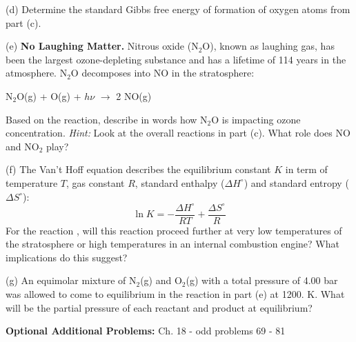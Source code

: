 \documentclass[11pt]{article}
\begin{document}
(d) Determine the standard Gibbs free energy of formation of oxygen atoms from part (c).

(e) \textbf{No Laughing Matter.} Nitrous oxide (N$_2$O), known as laughing gas,
has been the largest ozone-depleting substance and has a lifetime of 114 years in the
atmosphere. N$_2$O decomposes into NO in the stratosphere:
\begin{center}
  N$_2$O(g) + O(g) + $h\nu$ $\rightarrow$ 2 NO(g)
\end{center}
Based on the reaction, describe in words how N$_2$O is impacting ozone concentration.
\textit{Hint:} Look at the overall reactions in part (c). What role does NO and NO$_2$ play?

(f) The Van't Hoff equation describes the equilibrium constant $K$ in term of temperature
$T$, gas constant $R$, standard enthalpy ($\Delta H^\circ$) and standard entropy
($\Delta S^\circ$):
\begin{equation}
  \ln K = -\frac{\Delta H^\circ}{RT} + \frac{\Delta S^\circ}{R}
\end{equation}
For the reaction , will this reaction proceed further
at very low temperatures of the stratosphere or high temperatures in an internal combustion
engine? What implications do this suggest?

(g) An equimolar mixture of N$_2$(g) and O$_2$(g) with a total pressure of 4.00 bar
was allowed to come to equilibrium in the reaction in part (e) at 1200. K. What will
be the partial pressure of each reactant and product at equilibrium?


\vfill
\textbf{Optional Additional Problems:} Ch. 18 - odd problems 69 - 81
\end{document}
